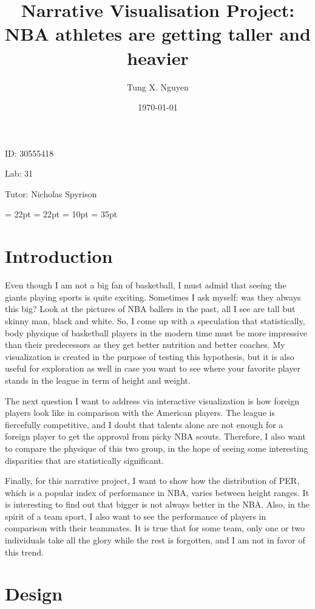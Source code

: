 \documentclass[a4paper,12pt,twoside]{article}
\title{Narrative Visualisation Project: NBA athletes are getting taller and heavier}
\author{Tung X. Nguyen}
\date{\today}
\numberwithin{equation}{section}
\begin{document}
\maketitle
ID: 30555418

Lab: 31

Tutor:  	Nicholas Spyrison
\thispagestyle{empty}

\tableofcontents
\listoffigures
\thispagestyle{empty}


\oddsidemargin = 22pt
\evensidemargin = 22pt
\marginparsep = 10pt
\marginparwidth = 35pt


\section{Introduction}
Even though I am not a big fan of basketball, I must admid that seeing the giants playing sports is quite exciting. Sometimes I ask myself: was they always this big? Look at the pictures of NBA ballers in the past, all I see are tall but skinny man, black and white. So, I come up with a speculation that statistically, body physique of basketball players in the modern time must be more impressive than their predecessors as they get better nutrition and better coaches. My visualization is created in the purpose of testing this hypothesis, but it is also useful for exploration as well in case you want to see where your favorite player stands in the league in term of height and weight.

The next question I want to address via interactive visualization is how foreign players look like in comparison with the American players. The league is fiercefully competitive, and I doubt that talents alone are not enough for a foreign player to get the approval from picky NBA scouts. Therefore, I also want to compare the physique of this two group, in the hope of seeing some interesting disparities that are statistically significant.

Finally, for this narrative project, I want to show how the distribution of PER, which is a popular index of performance in NBA, varies between height ranges. It is interesting to find out that bigger is not always better in the NBA. Also, in the spirit of a team sport, I also want to see the performance of players in comparison with their teammates. It is true that for some team, only one or two individuals take all the glory while the rest is forgotten, and I am not in favor of this trend.

\section{Design}
\end{document}
